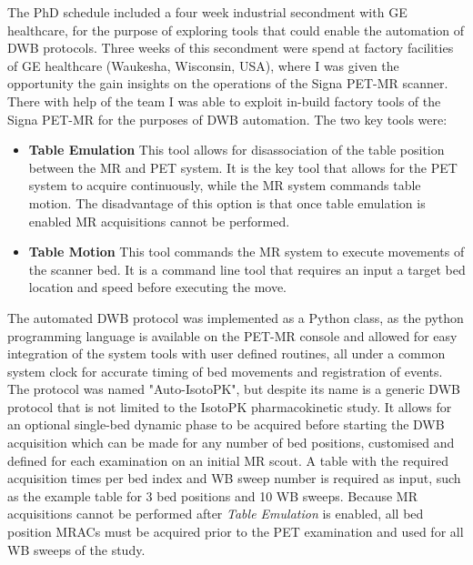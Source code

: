 The PhD schedule included a four week industrial secondment with GE healthcare, for the purpose of exploring tools that could enable the automation of DWB protocols. Three weeks of this secondment were spend at factory facilities of GE healthcare (Waukesha, Wisconsin, USA), where I was given the opportunity the gain insights on the operations of the Signa PET-MR scanner. There with help of the team I was able to exploit in-build factory tools of the Signa PET-MR for the purposes of DWB automation. The two key tools were: 
\begin{itemize}
    \item\textbf{Table Emulation}
    This tool allows for disassociation of the table position between the MR and PET system. It is the key tool that allows for the PET system to acquire continuously, while the MR system commands table motion. The disadvantage of this option is that once table emulation is enabled MR acquisitions cannot be performed.
    \item\textbf{Table Motion}
    This tool commands the MR system to execute movements of the scanner bed. It is a command line tool that requires an input a target bed location and speed before executing the move. 
\end{itemize}
% 
The automated DWB protocol was implemented as a Python class, as the python programming language is available on the PET-MR console and allowed for easy integration of the system tools with user defined routines, all under a common system clock for accurate timing of bed movements and registration of events.\\
The protocol was named "Auto-IsotoPK", but despite its name is a generic DWB protocol that is not limited to the IsotoPK pharmacokinetic study. It allows for an optional single-bed dynamic phase to be acquired before starting the DWB acquisition which can be made for any number of bed positions, customised and defined for each examination on an initial MR scout. A table with the required acquisition times per bed index and WB sweep number is required as input, such as the example table for 3 bed positions and 10 WB sweeps.
Because MR acquisitions cannot be performed after \textit{Table Emulation} is enabled, all bed position MRACs must be acquired prior to the PET examination and used for all WB sweeps of the study.


